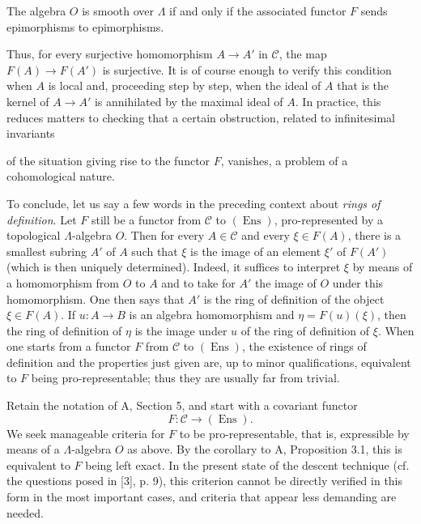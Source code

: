  The algebra $O$ is smooth over $\Lambda$ if and only
if the associated functor $F$ sends epimorphisms to epimorphisms.

Thus, for every surjective homomorphism $A\longrightarrow A'$ in
$\mathcal C$, the map $F(A)\longrightarrow F(A')$ is surjective. It is of
course enough to verify this condition when $A$ is local and, proceeding step
by step, when the ideal of $A$ that is the kernel of $A\longrightarrow A'$ is
annihilated by the maximal ideal of $A$. In practice, this reduces matters to
checking that a certain obstruction, related to infinitesimal invariants

of the situation giving rise to the functor $F$, vanishes, a problem of a
cohomological nature.

To conclude, let us say a few words in the preceding context about
\emph{rings of definition}. Let $F$ still be a functor from $\mathcal C$ to
$(\operatorname{Ens})$, pro-represented by a topological $\Lambda$-algebra
$O$. Then for every $A\in\mathcal C$ and every $\xi\in F(A)$, there is a
smallest subring $A'$ of $A$ such that $\xi$ is the image of an element $\xi'$
of $F(A')$ (which is then uniquely determined). Indeed, it suffices to
interpret $\xi$ by means of a homomorphism from $O$ to $A$ and to take for
$A'$ the image of $O$ under this homomorphism. One then says that $A'$ is the
ring of definition of the object $\xi\in F(A)$. If $u:A\longrightarrow B$ is
an algebra homomorphism and $\eta=F(u)(\xi)$, then the ring of definition of
$\eta$ is the image under $u$ of the ring of definition of $\xi$. When one
starts from a functor $F$ from $\mathcal C$ to $(\operatorname{Ens})$, the
existence of rings of definition and the properties just given are, up to
minor qualifications, equivalent to $F$ being pro-representable; thus they are
usually far from trivial.


Retain the notation of A, Section 5, and start with a covariant functor
\[
  F:\mathcal C\longrightarrow(\operatorname{Ens}).
\]
We seek manageable criteria for $F$ to be pro-representable, that is,
expressible by means of a $\Lambda$-algebra $O$ as above. By the corollary to
A, Proposition 3.1, this is equivalent to $F$ being left exact. In the present
state of the descent technique (cf. the questions posed in [3], p. 9), this
criterion cannot be directly verified in this form in the most important
cases, and criteria that appear less demanding are needed.

